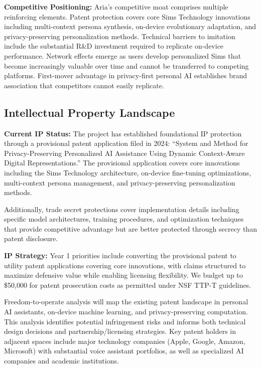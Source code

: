 \documentclass[11pt]{article}
\begin{document}
\textbf{Competitive Positioning:}
Aria's competitive moat comprises multiple reinforcing elements. Patent protection covers core Sims Technology innovations including multi-context persona synthesis, on-device evolutionary adaptation, and privacy-preserving personalization methods. Technical barriers to imitation include the substantial R\&D investment required to replicate on-device performance. Network effects emerge as users develop personalized Sims that become increasingly valuable over time and cannot be transferred to competing platforms. First-mover advantage in privacy-first personal AI establishes brand association that competitors cannot easily replicate.

\vspace*{-8pt}
\subsection{Intellectual Property Landscape}
\vspace*{-8pt}
\textbf{Current IP Status:}
The project has established foundational IP protection through a provisional patent application filed in 2024: ``System and Method for Privacy-Preserving Personalized AI Assistance Using Dynamic Context-Aware Digital Representations.'' The provisional application covers core innovations including the Sims Technology architecture, on-device fine-tuning optimizations, multi-context persona management, and privacy-preserving personalization methods.

Additionally, trade secret protections cover implementation details including specific model architectures, training procedures, and optimization techniques that provide competitive advantage but are better protected through secrecy than patent disclosure.

\textbf{IP Strategy:}
Year 1 priorities include converting the provisional patent to utility patent applications covering core innovations, with claims structured to maximize defensive value while enabling licensing flexibility. We budget up to \$50,000 for patent prosecution costs as permitted under NSF TTP-T guidelines.

Freedom-to-operate analysis will map the existing patent landscape in personal AI assistants, on-device machine learning, and privacy-preserving computation. This analysis identifies potential infringement risks and informs both technical design decisions and partnership/licensing strategies. Key patent holders in adjacent spaces include major technology companies (Apple, Google, Amazon, Microsoft) with substantial voice assistant portfolios, as well as specialized AI companies and academic institutions.
\end{document}
